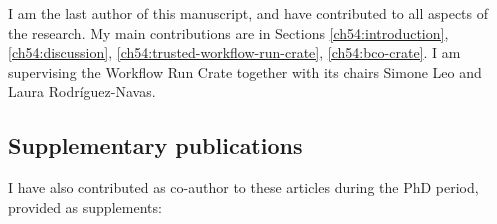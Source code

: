 I am the last author of this manuscript, and have contributed to all aspects of the research. My main contributions are in Sections \ref{ch54:introduction}, \ref{ch54:discussion}, \ref{ch54:trusted-workflow-run-crate}, \ref{ch54:bco-crate}. I am supervising the Workflow Run Crate  together with its chairs Simone Leo and Laura Rodríguez-Navas.



\subsection{Supplementary publications}\label{ch10:supplementary-publications}

I have also contributed as co-author to these articles during the PhD
period, provided as supplements:


